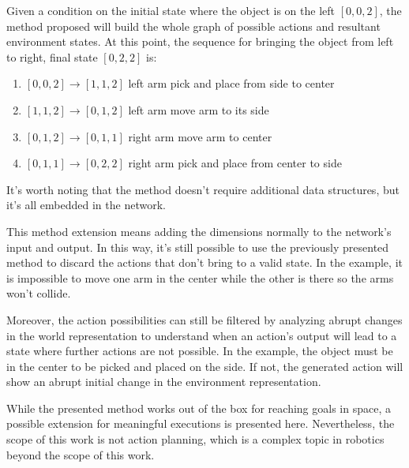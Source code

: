 Given a condition on the initial state where the object is on the left $[0,0,2]$, the method proposed will build the whole graph of possible actions and resultant environment states. At this point, the sequence for bringing the object from left to right, final state $[0,2,2]$ is:
\begin{enumerate}
  \item $[0,0,2] \rightarrow [1,1,2]$ left arm pick and place from side to center
  \item $[1,1,2] \rightarrow [0,1,2]$ left arm move arm to its side
  \item $[0,1,2] \rightarrow [0,1,1]$ right arm move arm to center
  \item $[0,1,1] \rightarrow [0,2,2]$ right arm pick and place from center to side
\end{enumerate}

It's worth noting that the method doesn't require additional data structures, but it's all embedded in the network. 

This method extension means adding the dimensions normally to the network's input and output. In this way, it's still possible to use the previously presented method to discard the actions that don't bring to a valid state. In the example, it is impossible to move one arm in the center while the other is there so the arms won't collide. 

Moreover, the action possibilities can still be filtered by analyzing abrupt changes in the world representation to understand when an action's output will lead to a state where further actions are not possible. In the example, the object must be in the center to be picked and placed on the side. If not, the generated action will show an abrupt initial change in the environment representation.

While the presented method works out of the box for reaching goals in space, a possible extension for meaningful executions is presented here. Nevertheless, the scope of this work is not action planning, which is a complex topic in robotics beyond the scope of this work.

